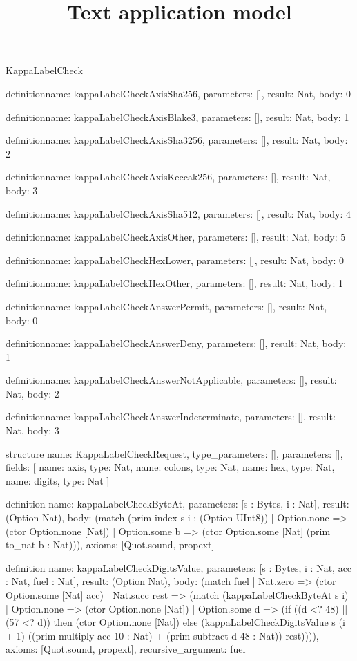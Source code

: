 \begin{lexlean}{KappaLabelCheck}
\title{Text application model}
\begin{semanticmodule}
definition{name: kappaLabelCheckAxisSha256, parameters: [], result: Nat, body: 0}

definition{name: kappaLabelCheckAxisBlake3, parameters: [], result: Nat, body: 1}

definition{name: kappaLabelCheckAxisSha3256, parameters: [], result: Nat, body: 2}

definition{name: kappaLabelCheckAxisKeccak256, parameters: [], result: Nat, body: 3}

definition{name: kappaLabelCheckAxisSha512, parameters: [], result: Nat, body: 4}

definition{name: kappaLabelCheckAxisOther, parameters: [], result: Nat, body: 5}

definition{name: kappaLabelCheckHexLower, parameters: [], result: Nat, body: 0}

definition{name: kappaLabelCheckHexOther, parameters: [], result: Nat, body: 1}

definition{name: kappaLabelCheckAnswerPermit, parameters: [], result: Nat, body: 0}

definition{name: kappaLabelCheckAnswerDeny, parameters: [], result: Nat, body: 1}

definition{name: kappaLabelCheckAnswerNotApplicable, parameters: [], result: Nat, body: 2}

definition{name: kappaLabelCheckAnswerIndeterminate, parameters: [], result: Nat, body: 3}

structure{
  name: KappaLabelCheckRequest,
  type_parameters: [],
  parameters: [],
  fields: [
    {name: axis, type: Nat},
    {name: colons, type: Nat},
    {name: hex, type: Nat},
    {name: digits, type: Nat}
  ]
}

definition{
  name: kappaLabelCheckByteAt,
  parameters: [s : Bytes, i : Nat],
  result: (Option Nat),
  body: (match (prim index s i : (Option UInt8))
    | Option.none => (ctor Option.none [Nat])
    | Option.some b => (ctor Option.some [Nat] (prim to_nat b : Nat))),
  axioms: [Quot.sound, propext]
}

definition{
  name: kappaLabelCheckDigitsValue,
  parameters: [s : Bytes, i : Nat, acc : Nat, fuel : Nat],
  result: (Option Nat),
  body: (match fuel
    | Nat.zero => (ctor Option.some [Nat] acc)
    | Nat.succ rest => (match (kappaLabelCheckByteAt s i)
      | Option.none => (ctor Option.none [Nat])
      | Option.some d => (if ((d <? 48) || (57 <? d)) then (ctor Option.none [Nat]) else (kappaLabelCheckDigitsValue s (i + 1) ((prim multiply acc 10 : Nat) + (prim subtract d 48 : Nat)) rest)))),
  axioms: [Quot.sound, propext],
  recursive_argument: fuel
}


\end{semanticmodule}
\end{lexlean}
